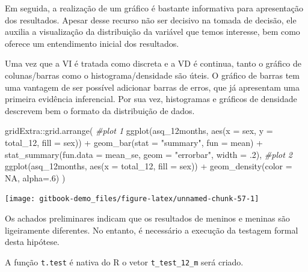 \documentclass[
]{book}
\newenvironment{Shaded}{\begin{snugshade}}{\end{snugshade}}
\newcommand{\AttributeTok}[1]{\textcolor[rgb]{0.77,0.63,0.00}{#1}}
\newcommand{\CommentTok}[1]{\textcolor[rgb]{0.56,0.35,0.01}{\textit{#1}}}
\newcommand{\ConstantTok}[1]{\textcolor[rgb]{0.00,0.00,0.00}{#1}}
\newcommand{\DecValTok}[1]{\textcolor[rgb]{0.00,0.00,0.81}{#1}}
\newcommand{\FunctionTok}[1]{\textcolor[rgb]{0.00,0.00,0.00}{#1}}
\newcommand{\NormalTok}[1]{#1}
\newcommand{\SpecialCharTok}[1]{\textcolor[rgb]{0.00,0.00,0.00}{#1}}
\newcommand{\StringTok}[1]{\textcolor[rgb]{0.31,0.60,0.02}{#1}}
\begin{document}
Em seguida, a realização de um gráfico é bastante informativa para apresentação dos resultados. Apesar desse recurso não ser decisivo na tomada de decisão, ele auxilia a visualização da distribuição da variável que temos interesse, bem como oferece um entendimento inicial dos resultados.

Uma vez que a VI é tratada como discreta e a VD é continua, tanto o gráfico de colunas/barras como o histograma/densidade são úteis. O gráfico de barras tem uma vantagem de ser possível adicionar barras de erros, que já apresentam uma primeira evidência inferencial. Por sua vez, histogramas e gráficos de densidade descrevem bem o formato da distribuição de dados.

\begin{Shaded}
\begin{Highlighting}[]
\NormalTok{gridExtra}\SpecialCharTok{::}\FunctionTok{grid.arrange}\NormalTok{(}
  \CommentTok{\#plot 1 }
  \FunctionTok{ggplot}\NormalTok{(asq\_12months, }\FunctionTok{aes}\NormalTok{(}\AttributeTok{x =}\NormalTok{ sex, }\AttributeTok{y =}\NormalTok{ total\_12, }\AttributeTok{fill =}\NormalTok{ sex)) }\SpecialCharTok{+}
    \FunctionTok{geom\_bar}\NormalTok{(}\AttributeTok{stat =} \StringTok{"summary"}\NormalTok{, }\AttributeTok{fun =}\NormalTok{ mean) }\SpecialCharTok{+}
    \FunctionTok{stat\_summary}\NormalTok{(}\AttributeTok{fun.data =}\NormalTok{ mean\_se, }\AttributeTok{geom =} \StringTok{"errorbar"}\NormalTok{, }
                 \AttributeTok{width =}\NormalTok{ .}\DecValTok{2}\NormalTok{),}
  \CommentTok{\#plot 2}
    \FunctionTok{ggplot}\NormalTok{(asq\_12months, }\FunctionTok{aes}\NormalTok{(}\AttributeTok{x =}\NormalTok{ total\_12, }\AttributeTok{fill =}\NormalTok{ sex)) }\SpecialCharTok{+} 
    \FunctionTok{geom\_density}\NormalTok{(}\AttributeTok{color =} \ConstantTok{NA}\NormalTok{, }\AttributeTok{alpha=}\NormalTok{.}\DecValTok{6}\NormalTok{)}
\NormalTok{)}
\end{Highlighting}
\end{Shaded}

\begin{center}\texttt{[image: gitbook-demo\_files/figure-latex/unnamed-chunk-57-1]} \end{center}

Os achados preliminares indicam que os resultados de meninos e meninas são ligeiramente diferentes. No entanto, é necessário a execução da testagem formal desta hipótese.

A função \texttt{t.test} é nativa do R o vetor \texttt{t\_test\_12\_m} será criado.
\end{document}
